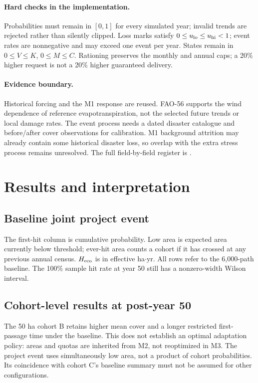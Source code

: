 \documentclass[11pt,a4paper]{article}
\newcommand{\file}[1]{{\small\texttt{\detokenize{#1}}}}
\begin{document}
\paragraph{Hard checks in the implementation.}
Probabilities must remain in $[0,1]$ for every simulated year; invalid trends are rejected rather than
silently clipped. Loss marks satisfy $0\le u_{\rm lo}\le u_{\rm hi}<1$; event rates are nonnegative and
may exceed one event per year. States remain in $0\le V\le K$, $0\le M\le C$.
Rationing preserves the monthly and annual caps; a 20\% higher request is not a 20\% higher guaranteed delivery.

\paragraph{Evidence boundary.}
Historical forcing and the M1 response are reused. FAO-56 supports the wind dependence of reference
evapotranspiration, not the selected future trends or local damage rates. The event process needs a
dated disaster catalogue and before/after cover observations for calibration. M1 background attrition
may already contain some historical disaster loss, so overlap with the extra stress process remains unresolved.
The full field-by-field register is \file{Data/v7/m3_inputs/README.md}.

\clearpage
\section{Results and interpretation}
\subsection*{Baseline joint project event}
\begin{center}\small\BaseTable\end{center}
The first-hit column is cumulative probability. Low area is expected area currently below threshold;
ever-hit area counts a cohort if it has crossed at any previous annual census.
$H_{\rm eco}$ is in effective ha$\cdot$yr. All rows refer to the 6,000-path baseline.
The 100\% sample hit rate at year 50 still has a nonzero-width Wilson interval.

\subsection*{Cohort-level results at post-year 50}
\begin{center}\small\CohortTable\end{center}
The 50 ha cohort B retains higher mean cover and a longer restricted first-passage time under the
baseline. This does not establish an optimal adaptation policy: areas and quotas are inherited from M2,
not reoptimized in M3. The project event uses simultaneously low area, not a product of cohort probabilities.
Its coincidence with cohort C's baseline summary must not be assumed for other configurations.
\end{document}
